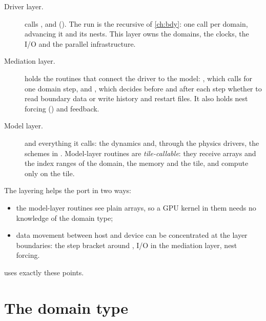 \begin{description}
  \item[Driver layer.]  calls ,  and 
    (). The run is the recursive  of
    \cref{ch:bdy}: one call per domain, advancing it and its nests. This layer owns the domains, the clocks, the I/O
    and the parallel infrastructure.
  \item[Mediation layer.]  holds the routines that connect the driver to the model:
    , which calls  for one domain step, and , which
    decides before and after each step whether to read boundary data or write history and restart files. It also
    holds nest forcing () and feedback.
  \item[Model layer.]  and everything it calls: the dynamics and, through the physics
    drivers, the schemes in . Model-layer routines are \emph{tile-callable}: they receive arrays and
    the index ranges of the domain, the memory and the tile, and compute only on the tile.
\end{description}

\begin{portnote}
The layering helps the port in two ways:
\begin{itemize}
  \item the model-layer routines see plain arrays, so a GPU kernel in them needs no knowledge of the domain type;
  \item data movement between host and device can be concentrated at the layer boundaries: the step bracket around
    , I/O in the mediation layer, nest forcing.
\end{itemize}
 uses exactly these points.
\end{portnote}

\section{The domain type}

